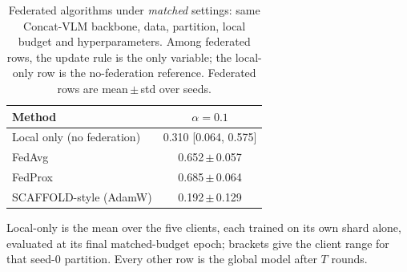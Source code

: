 \begin{table}[t]
\caption{Federated algorithms under \emph{matched} settings: same
Concat-VLM backbone, data, partition, local budget and hyperparameters.
Among federated rows, the update rule is the only variable; the local-only
row is the no-federation reference. Federated rows are
mean\,$\pm$\,std over seeds.}
\label{tab:baselines}
\centering\footnotesize
\setlength\tabcolsep{5pt}
\begin{tabular}{lc}
\toprule
\textbf{Method} & $\alpha=0.1$\\
\midrule
Local only (no federation) & 0.310 [0.064, 0.575] \\
FedAvg & 0.652\,$\pm$\,0.057 \\
FedProx & 0.685\,$\pm$\,0.064 \\
SCAFFOLD-style (AdamW) & 0.192\,$\pm$\,0.129 \\
\bottomrule
\end{tabular}
\vspace{1pt}

{\scriptsize Local-only is the mean over the five clients, each trained on its
own shard alone, evaluated at its final matched-budget epoch; brackets give
the client range for that seed-0 partition. Every other
row is the global model after $T$ rounds.}
\end{table}
